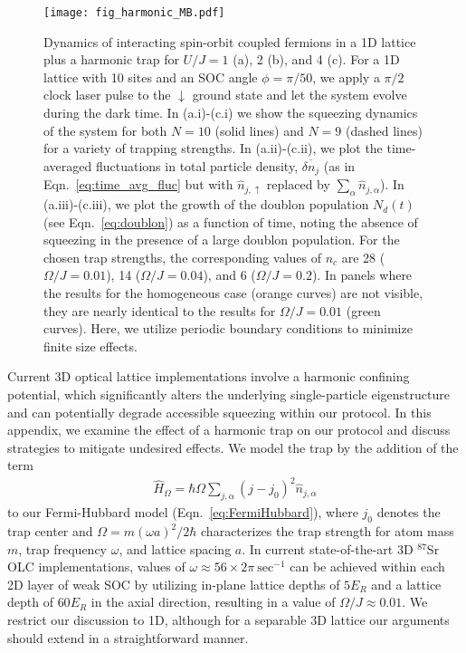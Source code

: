 \documentclass[aps,prx,superscriptaddress,notitlepage,twocolumn,longbibliography]{revtex4-2}
\renewcommand{\t}{\text} %
\begin{document}
\begin{figure*}
    \texttt{[image: fig\_harmonic\_MB.pdf]}
    \label{fig:harmonic_trap_MB1}
    \caption{Dynamics of interacting spin-orbit  coupled fermions in a 1D lattice plus a harmonic trap for $U/J = 1$ (a), 2 (b), and 4 (c). For a 1D lattice with 10 sites and an SOC angle $\phi = \pi/50$, we apply a $\pi/2$ clock laser pulse to the $\downarrow$ ground state and let the system evolve during the dark time. In (a.i)-(c.i) we show the squeezing dynamics of the system for both $N = 10$ (solid lines) and $N = 9$ (dashed lines) for a variety of trapping strengths. In (a.ii)-(c.ii), we plot the time-averaged fluctuations in total particle density, $\overline{\delta n_j}$ (as in Eqn.~\eqref{eq:time_avg_fluc} but with $\hat{n}_{j,\uparrow}$ replaced by $\sum_{\alpha}\hat{n}_{j,\alpha}$). In (a.iii)-(c.iii), we plot the growth of the doublon population $N_d(t)$ (see Eqn.~\eqref{eq:doublon}) as a function of time, noting the absence of squeezing in the presence of a large doublon population. For the chosen trap strengths, the corresponding values of $n_c$ are 28 ($\Omega/J = 0.01$), 14 ($\Omega/J = 0.04$), and 6 ($\Omega/J = 0.2$). In panels where the results for the homogeneous case (orange curves) are not visible, they are nearly identical to the results for $\Omega/J = 0.01$ (green curves). Here, we utilize periodic boundary conditions to minimize finite size effects.}
    \label{fig:harmonic_trap_MB}
\end{figure*}

Current 3D optical lattice implementations involve a harmonic confining potential, which significantly alters the underlying single-particle eigenstructure and can potentially degrade accessible squeezing within our protocol. In this appendix, we examine the effect of a harmonic trap on our protocol and discuss strategies to mitigate undesired effects. We model the trap by the addition of the term
\begin{align}
    \hat{H}_{\Omega} = \hbar\Omega\sum_{j,\alpha}(j-j_0)^2\hat{n}_{j,\alpha}
\end{align}
to our Fermi-Hubbard model (Eqn.~\eqref{eq:FermiHubbard}), where $j_0$ denotes the trap center and $\Omega = m(\omega a)^2/2\hbar$ characterizes the trap strength for atom mass $m$, trap frequency $\omega$, and lattice spacing $a$. In current state-of-the-art 3D $^{87}$Sr OLC implementations, values of $\omega \approx 56 \times 2\pi~\t{sec}^{-1}$ can be achieved within each 2D layer of weak SOC by utilizing in-plane lattice depths of $5 E_R$ and a lattice depth of $60 E_R$ in the axial direction, resulting in a value of $\Omega/J \approx 0.01$. We restrict our discussion to 1D, although for a separable 3D lattice our arguments should extend in a straightforward manner.
\end{document}
